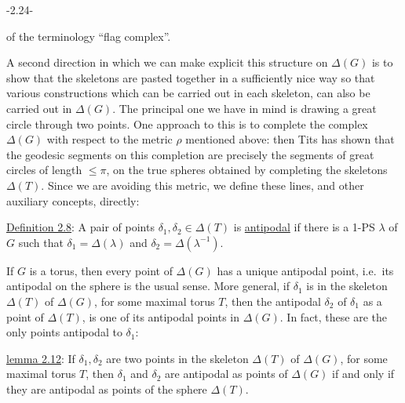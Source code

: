 \begin{center}-2.24-\end{center}
of the terminology ``flag complex''.

A second direction in which we can make explicit this structure on $\Delta(G)$ is to show that the skeletons are pasted together in a sufficiently nice way so that various constructions which can be carried out in each skeleton, can also be carried out in $\Delta(G)$. The principal one we have in mind is drawing a great circle through two points. One approach to this is to complete the complex $\Delta(G)$ with respect to the metric $\rho$ mentioned above: then Tits has shown that the geodesic segments on this completion are precisely the segments of great circles of length $\leq\pi$, on the true spheres obtained by completing the skeletons $\Delta(T)$. Since we are avoiding this metric, we define these lines, and other auxiliary concepts, directly:

\uline{Definition 2.8}: A pair of points $\delta_1,\delta_2\in\Delta(T)$ is \uline{antipodal} if there is a 1-PS $\lambda$ of $G$ such that $\delta_1=\Delta(\lambda)$ and $\delta_2=\Delta(\lambda^{-1})$.

If $G$ is a torus, then every point of $\Delta(G)$ has a unique antipodal point, i.e.\ its antipodal on the sphere is the usual sense. More general, if $\delta_1$ is in the skeleton $\Delta(T)$ of $\Delta(G)$, for some maximal torus $T$, then the antipodal $\delta_2$ of $\delta_1$ as a point of $\Delta(T)$, is one of its antipodal points in $\Delta(G)$. In fact, these are the only points antipodal to $\delta_1$:

\uline{lemma 2.12}: If $\delta_1,\delta_2$ are two points in the skeleton $\Delta(T)$ of $\Delta(G)$, for some maximal torus $T$, then $\delta_1$ and $\delta_2$ are antipodal as points of $\Delta(G)$ if and only if they are antipodal as points of the sphere $\Delta(T)$.
